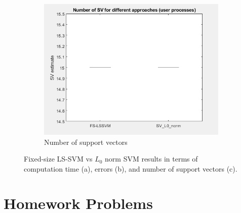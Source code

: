 \documentclass{article}
\begin{document}
\begin{figure}[h]
\begin{subfigure}[b]{0.3\textwidth}
                 \label{fig:l0error}
             \end{subfigure}
             \hfill
             \begin{subfigure}[b]{0.3\textwidth}
                 \centering
                 \includegraphics[width=\textwidth]{Assignment 3/figures/1_3/sv.png}
                 \caption{Number of support vectors}
                 \label{fig:l0Number_supports}
             \end{subfigure}
            \caption{Fixed-size LS-SVM vs $L_0$ norm SVM results in terms of computation time (a), errors (b), and number of support vectors (c).}
        \end{figure}
        
\section{Homework Problems} 
\end{document}
